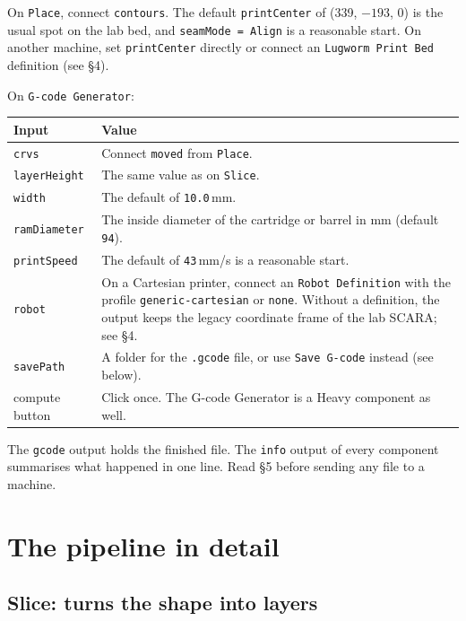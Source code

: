 \documentclass[11pt]{article}
\newcommand{\param}[1]{\texttt{#1}}
\begin{document}
On \param{Place}, connect \param{contours}. The default
\param{printCenter} of (339, $-193$, 0) is the usual spot on the lab
bed, and \param{seamMode = Align} is a reasonable start. On another
machine, set \param{printCenter} directly or connect an \param{Lugworm
Print Bed} definition (see \S 4).

On \param{G-code Generator}:

\begin{longtable}{@{}p{3.0cm}p{9.5cm}@{}}
\toprule
\textbf{Input} & \textbf{Value} \\
\midrule
\endhead
\param{crvs} & Connect \param{moved} from \param{Place}. \\
\param{layerHeight} & The same value as on \param{Slice}. \\
\param{width} & The default of \param{10.0}\,mm. \\
\param{ramDiameter} & The inside diameter of the cartridge or barrel in mm (default \param{94}). \\
\param{printSpeed} & The default of \param{43}\,mm/s is a reasonable start. \\
\param{robot} & On a Cartesian printer, connect an \param{Robot Definition} with the profile \param{generic-cartesian} or \param{none}. Without a definition, the output keeps the legacy coordinate frame of the lab SCARA; see \S 4. \\
\param{savePath} & A folder for the \param{.gcode} file, or use \param{Save G-code} instead (see below). \\
compute button & Click once. The G-code Generator is a Heavy component as well. \\
\bottomrule
\end{longtable}

The \param{gcode} output holds the finished file. The \param{info}
output of every component summarises what happened in one line. Read
\S 5 before sending any file to a machine.

\section{The pipeline in detail}

\subsection{Slice: turns the shape into layers}
\end{document}
